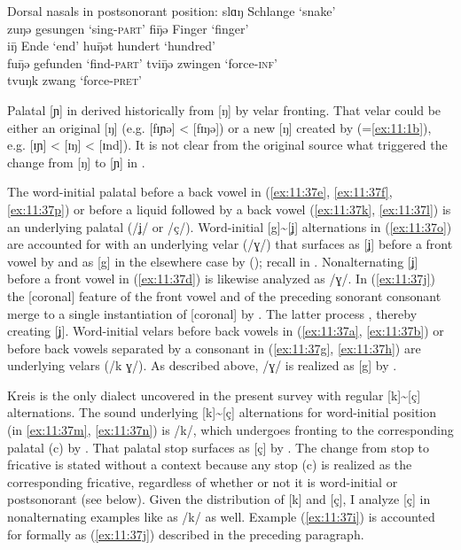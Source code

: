 \ea%
\label{ex:11:39}Dorsal nasals in postsonorant position:
\ea\label{ex:11:39a} slɑŋ \tab [slɑŋ] \tab Schlange \tab ‘snake’ \\
    zuŋə \tab [zuŋə] \tab gesungen \tab ‘sing-\textsc{part}’ 
\ex\label{ex:11:39b} fi\={ŋ}ə \tab [fɪɲə] \tab Finger \tab ‘finger’ \\
    i\={ŋ} \tab [ɪɲ] \tab Ende \tab ‘end’ 
\ex\label{ex:11:39c} hu\={ŋ}ət \tab [huɲət] \tab hundert \tab ‘hundred’ \\
    fu\={ŋ}ə \tab [fuɲə] \tab gefunden \tab ‘find-\textsc{part}’ 
\ex\label{ex:11:39d} tvi\={ŋ}ə \tab [tviɲə] \tab zwingen \tab ‘force-\textsc{inf}’ \\
    tvuŋk \tab [tvuŋk] \tab zwang \tab ‘force-\textsc{pret}’ 
\z 
\z 

Palatal [ɲ] in  derived historically from [ŋ] by velar fronting. That velar could be either an original [ŋ] (e.g. [fɪɲə] < [fɪŋə]) or a new [ŋ] created by  (=\ref{ex:11:1b}), e.g. [ɪɲ] < [ɪŋ] < [ɪnd]). It is not clear from the original source what triggered the change from [ŋ] to [ɲ] in .

The word-initial palatal before a back vowel in (\ref{ex:11:37e}, \ref{ex:11:37f}, \ref{ex:11:37p}) or before a liquid followed by a back vowel (\ref{ex:11:37k}, \ref{ex:11:37l}) is an underlying palatal (/ʝ/ or /ç/). Word-initial [g]{\textasciitilde}[ʝ] alternations in (\ref{ex:11:37o}) are accounted for with an underlying velar (/ɣ/) that surfaces as [ʝ] before a front vowel by  and as [g] in the elsewhere case by  (); recall  in . Nonalternating [ʝ] before a front vowel in (\ref{ex:11:37d}) is likewise analyzed as /ɣ/. In (\ref{ex:11:37j}) the [coronal] feature of the front vowel and of the preceding sonorant consonant merge to a single instantiation of [coronal] by . The latter process  , thereby creating [ʝ]. Word-initial velars before back vowels in (\ref{ex:11:37a}, \ref{ex:11:37b}) or before back vowels separated by a consonant in (\ref{ex:11:37g}, \ref{ex:11:37h}) are underlying velars (/k ɣ/). As described above, /ɣ/ is realized as [g] by .

Kreis  is the only dialect uncovered in the present survey with regular [k]{\textasciitilde}[ç] alternations. The sound underlying [k]{\textasciitilde}[ç] alternations for word-initial position (in \ref{ex:11:37m}, \ref{ex:11:37n}) is /k/, which undergoes fronting to the corresponding palatal ({\textbar}c{\textbar}) by . That palatal stop surfaces as [ç] by . The change from stop to fricative is stated without a context because any  stop ({\textbar}c{\textbar}) is realized as the corresponding fricative, regardless of whether or not it is word-initial or postsonorant (see below). Given the distribution of [k] and [ç], I analyze [ç] in nonalternating examples like  as /k/ as well. Example (\ref{ex:11:37i}) is accounted for formally as (\ref{ex:11:37j}) described in the preceding paragraph.

